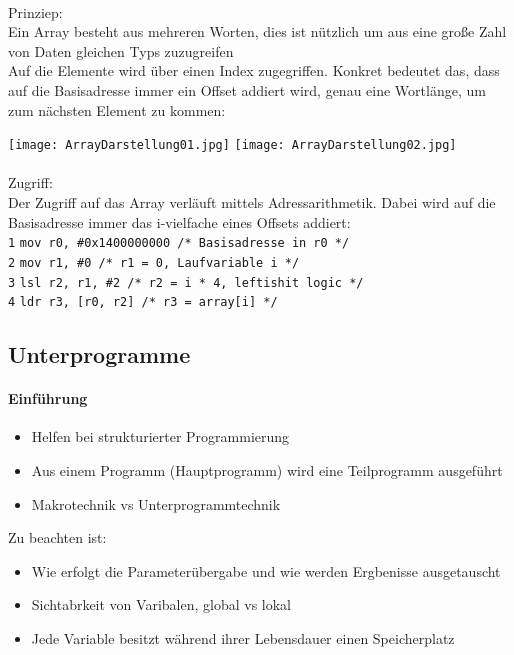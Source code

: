 		\paragraph{} Prinziep: \\
		Ein Array besteht aus mehreren Worten, dies ist nützlich um aus eine große
		Zahl von Daten gleichen Typs zuzugreifen \\
		Auf die Elemente wird über einen Index zugegriffen. Konkret bedeutet das, dass
		auf die Basisadresse immer ein Offset addiert wird, genau eine Wortlänge, um 
		zum nächsten Element zu kommen:
		\begin{center}
			\texttt{[image: ArrayDarstellung01.jpg]}
			\texttt{[image: ArrayDarstellung02.jpg]}
		\end{center}
		
		\paragraph{} Zugriff: \\
		Der Zugriff auf das Array verläuft mittels Adressarithmetik. Dabei wird auf 
		die Basisadresse immer das i-vielfache eines Offsets addiert: \\
		\texttt{1} \hspace{0.2cm} \texttt{mov r0, \#0x1400000000 /* Basisadresse in r0 */} \\
		\texttt{2} \hspace{0.2cm} \texttt{mov r1, \#0 /* r1 = 0, Laufvariable i */} \\
		\texttt{3} \hspace{0.2cm} \texttt{lsl r2, r1, \#2 /* r2 = i * 4, leftishit logic */} \\
		\texttt{4} \hspace{0.2cm} \texttt{ldr r3, [r0, r2] /* r3 = array[i] */} \\
		
			
			
			
	\subsection{Unterprogramme}
		\paragraph{Einführung}
		\begin{itemize}
			\item Helfen bei strukturierter Programmierung
			\item Aus einem Programm (Hauptprogramm) wird eine Teilprogramm ausgeführt
			\item Makrotechnik vs Unterprogrammtechnik
		\end{itemize}
		Zu beachten ist:
		\begin{itemize}
			\item Wie erfolgt die Parameterübergabe und wie werden Ergbenisse ausgetauscht
			\item Sichtabrkeit von Varibalen, global vs lokal
			\item Jede Variable besitzt während ihrer Lebensdauer einen Speicherplatz
		\end{itemize}
		\vspace{0.2cm}
		
